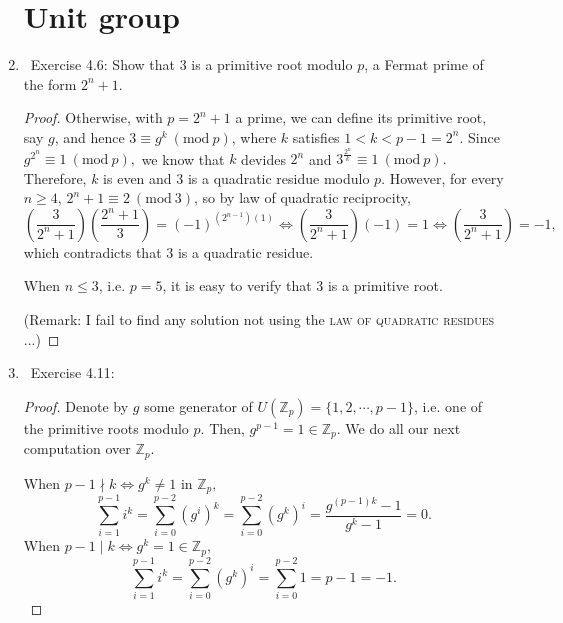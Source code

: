 \documentclass[11pt]{article}
\newcommand\0{\mathbf{0}}
\newcommand\ZZ{\mathbb{Z}}
\newcommand\<{\langle}
\renewcommand\>{\rangle}
\renewcommand\iff{\Leftrightarrow}
\renewcommand\mod[1]{\ (\mathrm{mod}\ #1)}
\begin{document}
\begin{enumerate}
\section{Unit group}
\item\ 
Exercise 4.6: Show that $3$ is a primitive root modulo $p$, a Fermat prime of the form $2^n+1.$
\begin{proof}
    Otherwise, with $p = 2^n+1$ a prime, we can define its primitive root, say $g$, and hence $3 \equiv g^k \mod p$, where $k$ satisfies $1 < k < p-1 = 2^n.$  Since $g^{2^n} \equiv 1 \mod p,$ we know that $k$ devides $2^n$ and $3^{\frac{2^n}{k}} \equiv 1 \mod p.$ 
Therefore, $k$ is even and $3$ is a quadratic residue modulo $p$. However, for every $n \geq 4$, $2^n+1 \equiv 2 \mod 3$, so by law of quadratic reciprocity,
\[
 {\genfrac{(}{)}{}{}{3}{2^n+1}}{\genfrac{(}{)}{}{}{2^n+1}{3}} = (-1)^{(2^{n-1})(1)}
\iff {\genfrac{(}{)}{}{}{3}{2^n+1}}(-1) = 1
\iff {\genfrac{(}{)}{}{}{3}{2^n+1}} = -1,
\]
which contradicts that 3 is a quadratic residue.

When $n \leq 3$, i.e. $p=5$, it is easy to verify that $3$ is a primitive root.

(Remark: I fail to find any solution not using the \textsc{law of quadratic residues} ...)
\end{proof}
\item\ 
Exercise 4.11:
\begin{proof}
  Denote by $g$ some generator of $U(\ZZ_p) = \{1, 2, \cdots, p-1\}$, i.e. one of the primitive roots modulo $p$. Then, $g^{p-1} = 1 \in \ZZ_p.$ We do all our next computation over $\ZZ_p.$

  When $p-1 \nmid k \iff g^k \neq 1$ in $\ZZ_p,$ 
\[\displaystyle\sum_{i=1}^{p-1}i^k = \sum_{i=0}^{p-2}(g^i)^k = \sum_{i=0}^{p-2}(g^{k})^i = \frac{g^{(p-1)k}-1}{g^k -1} = 0.\]
  When $p-1 \mid k \iff g^k = 1 \in \ZZ_p,$  \[\displaystyle\sum_{i=1}^{p-1}i^k = \sum_{i=0}^{p-2}(g^{k})^i = \sum_{i=0}^{p-2}1 = p-1 = -1.\]
\end{proof}

\end{enumerate}
\end{document}
